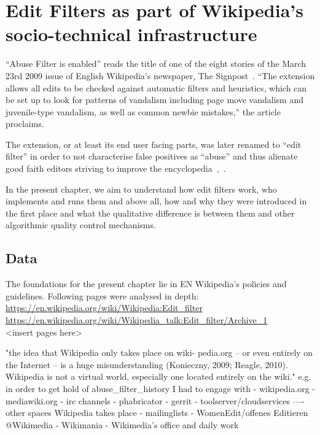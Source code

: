 \chapter{Edit Filters as part of Wikipedia's socio-technical infrastructure}
\label{chap:filters}


``Abuse Filter is enabled'' reads the title of one of the eight stories of the March 23rd 2009 issue of English Wikipedia's newspaper, The Signpost~\cite{Signpost2009}.
``The extension allows all edits to be checked against automatic filters and heuristics, which can be set up to look for patterns of vandalism including page move vandalism and juvenile-type vandalism, as well as common newbie mistakes,'' the article proclaims.

The extension, or at least its end user facing parts, was later renamed to ``edit filter'' in order to not characterise false positives as ``abuse'' and thus alienate good faith editors striving to improve the encyclopedia~\cite{Wikipedia:EditFilter},~\cite{Wikipedia:EditFilterTalkArchiveNameChange}.

In the present chapter, we aim to understand how edit filters work, who implements and runs them and above all, how and why they were introduced in the first place and what the qualitative difference is between them and other algorithmic quality control mechanisms.

\section{Data}

The foundations for the present chapter lie in EN Wikipedia's policies and guidelines.
Following pages were analysed in depth: \\
\url{https://en.wikipedia.org/wiki/Wikipedia:Edit_filter} \\
\url{https://en.wikipedia.org/wiki/Wikipedia_talk:Edit_filter/Archive_1} \\
<insert pages here>

\cite{Geiger2014}
"the idea that Wikipedia only takes place on wiki-
pedia.org – or even entirely on the Internet – is a huge misunderstanding (Konieczny, 2009;
Reagle, 2010). Wikipedia is not a virtual world, especially one located entirely on the wiki."
e.g. in order to get hold of abuse_filter_history I had to engage with
- wikipedia.org
- mediawiki.org
- irc channels
- phabricator
- gerrit
- toolserver/cloudservices
----
other spaces Wikipedia takes place
- mailinglists
- WomenEdit/offenes Editieren @Wikimedia
- Wikimania
- Wikimedia's office and daily work

